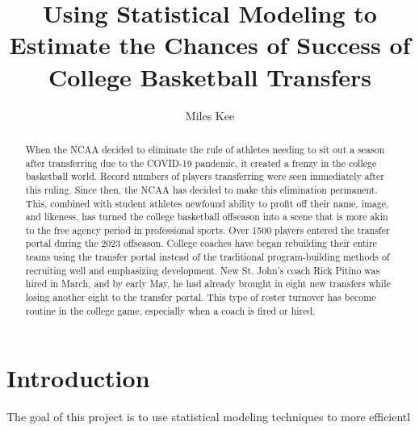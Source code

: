 \documentclass[12pt]{article}
\title{Using Statistical Modeling to Estimate the Chances of Success of College Basketball Transfers}
\author{Miles Kee}
\begin{document}
\maketitle

\begin{abstract}
When the NCAA decided to eliminate the rule of athletes needing to sit out a season after transferring due to the COVID-19 pandemic, it created a frenzy in the college basketball world. Record numbers of players transferring were seen immediately after this ruling. Since then, the NCAA has decided to make this elimination permanent. This, combined with student athletes newfound ability to profit off their name, image, and likeness, has turned the college basketball offseason into a scene that is more akin to the free agency period in professional sports. Over 1500 players entered the transfer portal during the 2023 offseason. College coaches have began rebuilding their entire teams using the transfer portal instead of the traditional program-building methods of recruiting well and emphasizing development. New St. John's coach Rick Pitino was hired in March, and by early May, he had already brought in eight new transfers while losing another eight to the transfer portal. This type of roster turnover has become routine in the college game, especially when a coach is fired or hired. 
\end{abstract}

\section{Introduction}
The goal of this project is to use statistical modeling techniques to more efficientl
\end{document}
